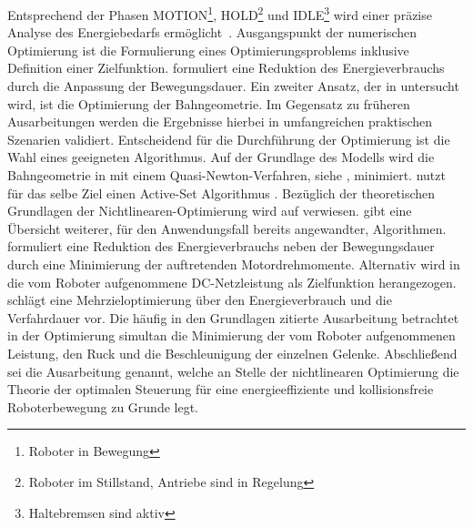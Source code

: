 Entsprechend der Phasen MOTION\footnote{Roboter in Bewegung}, HOLD\footnote{Roboter im Stillstand, Antriebe sind in Regelung} und IDLE\footnote{Haltebremsen sind aktiv} wird einer präzise Analyse des Energiebedarfs ermöglicht~\cite{Ziaukas.2017}. 
%
Ausgangspunkt der numerischen Optimierung ist die Formulierung eines Optimierungsproblems inklusive Definition einer Zielfunktion.  
\cite{Ziaukas.2017} formuliert eine  Reduktion des Energieverbrauchs durch die Anpassung der Bewegungsdauer. 
%
Ein zweiter Ansatz, der in \cite{Eggers.2019} untersucht wird, ist die Optimierung der Bahngeometrie.  Im Gegensatz zu früheren Ausarbeitungen werden die Ergebnisse hierbei in umfangreichen praktischen Szenarien validiert. 
Entscheidend für die Durchführung der Optimierung ist die Wahl eines geeigneten Algorithmus. %
%
%
Auf der Grundlage des Modells wird die Bahngeometrie in \Cite{Hansen.2012} mit einem Quasi-Newton-Verfahren, siehe \cite[S.~49]{Papageorgiou.2015}, minimiert. \cite{Ziaukas.2017} nutzt für das selbe Ziel einen Active-Set Algorithmus \cite[S.~445]{Luenberger.2021}. Bezüglich der theoretischen Grundlagen der Nichtlinearen-Optimierung wird auf \cite{Nocedal.2006} verwiesen. \cite[S.10~ff.]{Carabin.2017} gibt eine Übersicht weiterer, für den Anwendungsfall bereits angewandter, Algorithmen. \cite{Ziaukas.2017} formuliert eine Reduktion des Energieverbrauchs neben der Bewegungsdauer durch eine Minimierung der auftretenden Motordrehmomente. Alternativ wird in \cite{Hansen.2012} die vom Roboter aufgenommene DC-Netzleistung als Zielfunktion herangezogen. \cite{Lin.2018} schlägt eine Mehrzieloptimierung über den  Energieverbrauch und die Verfahrdauer vor. Die häufig in den Grundlagen zitierte Ausarbeitung \cite{Saravanan.2008} betrachtet in der Optimierung simultan die Minimierung der vom Roboter aufgenommenen Leistung, den Ruck  und die Beschleunigung der einzelnen Gelenke. Abschließend sei die Ausarbeitung  \cite{Bjorkenstam.2013} genannt, welche an Stelle der nichtlinearen Optimierung die Theorie der optimalen Steuerung für eine energieeffiziente und kollisionsfreie Roboterbewegung zu Grunde legt.
%
%

